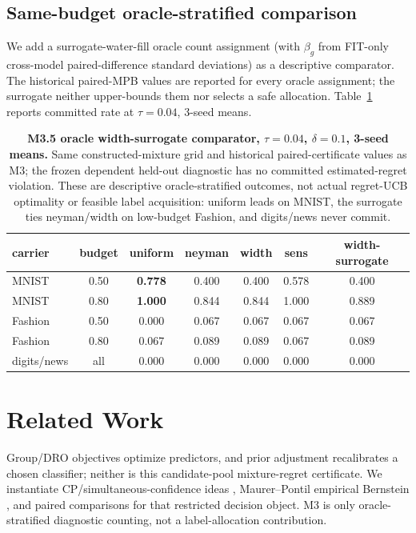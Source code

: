 \documentclass{article}
\begin{document}
\subsection{Same-budget oracle-stratified comparison}
We add a surrogate-water-fill oracle count assignment (with $\beta_g$ from FIT-only cross-model
paired-difference standard deviations) as a descriptive comparator. The historical paired-MPB
values are reported for every oracle assignment; the surrogate neither upper-bounds them nor
selects a safe allocation. Table~\ref{tab:m35} reports committed rate at $\tau{=}0.04$, 3-seed
means.
\FloatBarrier
\begin{table}[H]
\centering\small\setlength{\tabcolsep}{4pt}
\begin{tabular}{lcccccc}
\toprule
carrier & budget & uniform & neyman & width & sens & width-surrogate \\
\midrule
MNIST & 0.50 & \textbf{0.778} & 0.400 & 0.400 & 0.578 & 0.400 \\
MNIST & 0.80 & \textbf{1.000} & 0.844 & 0.844 & 1.000 & 0.889 \\
Fashion & 0.50 & 0.000 & 0.067 & 0.067 & 0.067 & 0.067 \\
Fashion & 0.80 & 0.067 & 0.089 & 0.089 & 0.067 & 0.089 \\
digits/news & all & 0.000 & 0.000 & 0.000 & 0.000 & 0.000 \\
\bottomrule
\end{tabular}
\caption{\textbf{M3.5 oracle width-surrogate comparator, $\tau{=}0.04$, $\delta{=}0.1$, 3-seed means.}
Same constructed-mixture grid and historical paired-certificate values as M3; the frozen
dependent held-out diagnostic has no committed estimated-regret violation. These are descriptive
oracle-stratified outcomes, not actual regret-UCB optimality or feasible label acquisition:
uniform leads on MNIST, the surrogate ties neyman/width on low-budget Fashion, and digits/news
never commit.
}
\label{tab:m35}
\end{table}

\section{Related Work}
\label{sec:related}

Group/DRO objectives \citep{sagawa2019distribution,duchi2019sparse} optimize predictors, and
prior adjustment \citep{saerens2002adjusting} recalibrates a chosen classifier; neither is this
candidate-pool mixture-regret certificate. We instantiate CP/simultaneous-confidence ideas
\citep{vovk2005conformal,clopper1934inverse}, Maurer--Pontil empirical Bernstein
\citep{maurer2009bernstein}, and paired comparisons \citep{dunnett1955multiple,hsu1984simultaneous}
for that restricted decision object. M3 is only oracle-stratified diagnostic counting, not a
label-allocation contribution.
\end{document}
